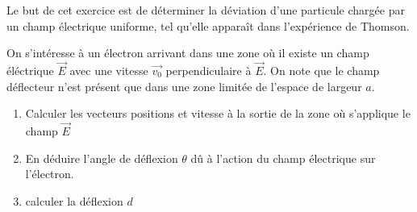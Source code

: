 \begin{Exercise}[title=Déviation d'un électron par un champ électrique]
  \begin{minipage}{.45\linewidth}
    Le but de cet exercice est de déterminer la déviation d'une particule chargée par un champ électrique uniforme, tel qu'elle apparaît dans l'expérience de Thomson.

    On s'intéresse à un électron arrivant dans une zone où il existe un champ éléctrique $\vec{E}$ avec une vitesse $\vec{v_0}$ perpendiculaire à $\vec{E}$. On note que le champ déflecteur n'est présent que dans une zone limitée de l'espace de largeur $a$.
    \begin{enumerate}
    \item Calculer les vecteurs positions et vitesse à la sortie de la zone où s'applique le champ $\vec{E}$
    \item En déduire l'angle de déflexion $\theta$ dû à l'action du champ électrique sur l'électron.
    \item calculer la déflexion $d$
    \end{enumerate}
  \end{minipage}\hspace{.05\linewidth}
  \begin{minipage}{.45\linewidth}
  \end{minipage}
\end{Exercise}
